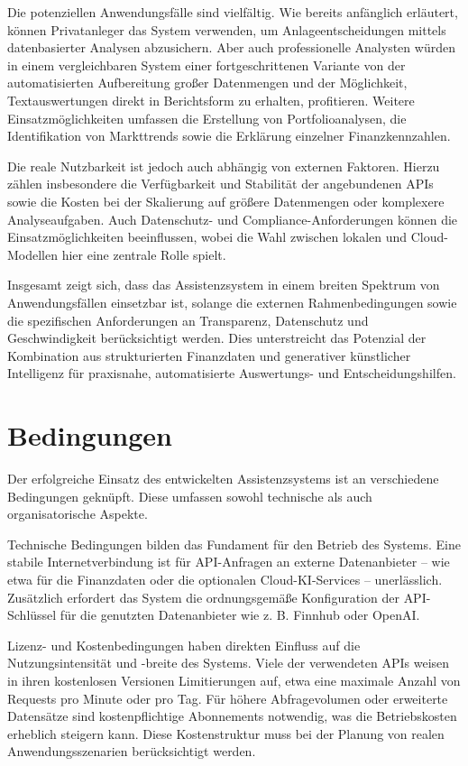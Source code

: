     Die potenziellen Anwendungsfälle sind vielfältig.
    Wie bereits anfänglich erläutert, können Privatanleger das System verwenden, um Anlageentscheidungen mittels datenbasierter Analysen abzusichern.
    Aber auch professionelle Analysten würden in einem vergleichbaren System einer fortgeschrittenen Variante von der automatisierten Aufbereitung großer Datenmengen und der Möglichkeit, Textauswertungen direkt in Berichtsform zu erhalten, profitieren.
    Weitere Einsatzmöglichkeiten umfassen die Erstellung von Portfolioanalysen, die Identifikation von Markttrends sowie die Erklärung einzelner Finanzkennzahlen.

    Die reale Nutzbarkeit ist jedoch auch abhängig von externen Faktoren.
    Hierzu zählen insbesondere die Verfügbarkeit und Stabilität der angebundenen \acs{API}s sowie die Kosten bei der Skalierung auf größere Datenmengen oder komplexere Analyseaufgaben.
    Auch Datenschutz- und Compliance-Anforderungen können die Einsatzmöglichkeiten beeinflussen, wobei die Wahl zwischen lokalen und Cloud-Modellen hier eine zentrale Rolle spielt.

    Insgesamt zeigt sich, dass das Assistenzsystem in einem breiten Spektrum von Anwendungsfällen einsetzbar ist, solange die externen Rahmenbedingungen sowie die spezifischen Anforderungen an Transparenz, Datenschutz und Geschwindigkeit berücksichtigt werden.
    Dies unterstreicht das Potenzial der Kombination aus strukturierten Finanzdaten und generativer künstlicher Intelligenz für praxisnahe, automatisierte Auswertungs- und Entscheidungshilfen.

  \section{Bedingungen}

    Der erfolgreiche Einsatz des entwickelten Assistenzsystems ist an verschiedene Bedingungen geknüpft.
    Diese umfassen sowohl technische als auch organisatorische Aspekte.

    Technische Bedingungen bilden das Fundament für den Betrieb des Systems.
    Eine stabile Internetverbindung ist für \acs{API}-Anfragen an externe Datenanbieter -- wie etwa für die Finanzdaten oder die optionalen Cloud-\acs{KI}-Services -- unerlässlich.
    Zusätzlich erfordert das System die ordnungsgemäße Konfiguration der \acs{API}-Schlüssel für die genutzten Datenanbieter wie z. B. Finnhub oder OpenAI.

    Lizenz- und Kostenbedingungen haben direkten Einfluss auf die Nutzungsintensität und -breite des Systems.
    Viele der verwendeten \acs{API}s weisen in ihren kostenlosen Versionen Limitierungen auf, etwa eine maximale Anzahl von Requests pro Minute oder pro Tag.
    Für höhere Abfragevolumen oder erweiterte Datensätze sind kostenpflichtige Abonnements notwendig, was die Betriebskosten erheblich steigern kann.
    Diese Kostenstruktur muss bei der Planung von realen Anwendungsszenarien berücksichtigt werden.

